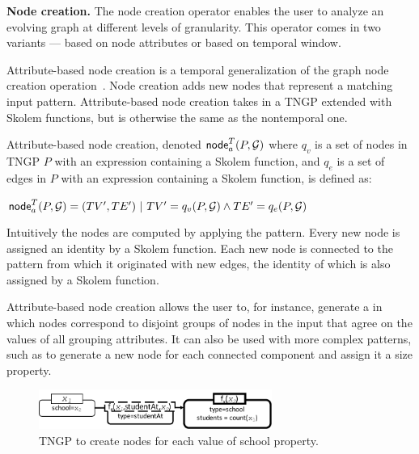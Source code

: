 {\bf Node creation.}  The node creation operator enables the user to
analyze an evolving graph at different levels of granularity.  This
operator comes in two variants --- based on node attributes or based
on temporal window.

Attribute-based node creation is a temporal generalization of the
graph node creation operation~\cite{Wood2012}.  Node creation adds new
nodes that represent a matching input pattern.  Attribute-based node
creation takes in a TNGP extended with Skolem functions, but is
otherwise the same as the nontemporal one.

\begin{definition}
\label{def:nodecra}
Attribute-based node creation, denoted $\textsf{node}^T_a(P,\mathcal{G})$
where $q_v$ is a set of nodes in TNGP $P$ with an expression containing a
Skolem function, and $q_e$ is a set of edges in $P$ with an expression
containing a Skolem function, is defined as:

$\textsf{node}^T_a(P,\mathcal{G}) = (TV',TE') ~|~ TV' = q_v(P,\mathcal{G}) \land TE' = q_e(P,\mathcal{G})$
\end{definition}

Intuitively the nodes are computed
by applying the pattern.  Every new node is assigned an identity by a
Skolem function.  Each new node is connected to the pattern from which
it originated with new edges, the identity of which is also assigned
by a Skolem function.

Attribute-based node creation allows the user to, for instance,
generate a \tg in which nodes correspond to disjoint groups of nodes
in the input that agree on the values of all grouping attributes.  It
can also be used with more complex patterns, such as to generate a new
node for each connected component and assign it a size property.

\begin{figure}
\centering
\includegraphics[width=3in]{figs/schoolncr.pdf}
\caption{TNGP to create nodes for each value of school property.}
\vspace{-0.2cm}
\label{fig:schoolncr}
\end{figure}

